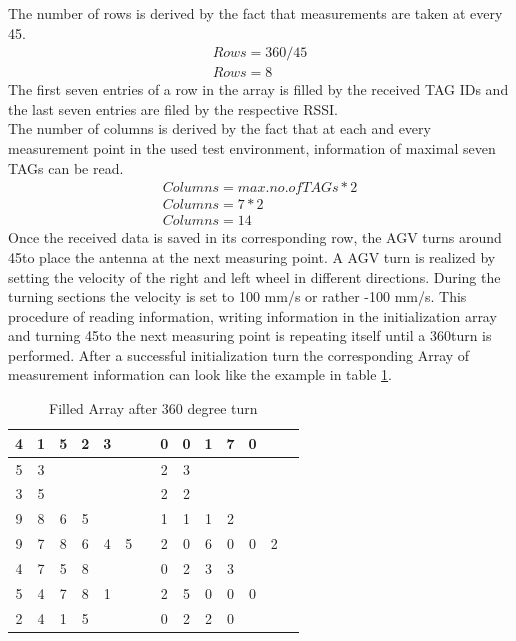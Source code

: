 The number of rows is derived by the fact that measurements are taken at every 45\textdegree. \\
\begin{align}
Rows = 360/45\\
Rows = 8
\end{align}
The first seven entries of a row in the array is filled by the received TAG IDs and the last seven entries are filed by the respective RSSI. \\
The number of columns is derived by the fact that at each and every measurement point in the used test environment, information of maximal seven TAGs can be read. \\
\begin{align}
Columns = max. no. of  TAGs * 2\\
Columns = 7 * 2\\
Columns = 14
\end{align}
Once the received data is saved in its corresponding row, the AGV turns around 45\textdegree  to place the antenna at the next measuring point. A AGV turn is realized by setting the velocity of the right and left wheel in different directions. During the turning sections the velocity is set to 100 mm/s or rather -100 mm/s. 
This procedure of reading information, writing information in the initialization array and turning 45\textdegree  to the next measuring point is repeating itself until a 360\textdegree  turn is performed. After a successful initialization turn the corresponding Array of measurement information can look like the example in table \ref{Init_Array}.
\begin{table}[!htbp]
\centering
\begin{tabular}{|c|c|c|c|c|c|c|c|c|c|c|c|c|c|}
\hline
4&1&5&2&3&&&0&0&1&7&0&&  \\ \hline
5&3&&&&&&2&3&&&&&  \\ \hline
3&5&&&&&&2&2&&&&&  \\ \hline
9&8&6&5&&&&1&1&1&2&&&  \\ \hline
9&7&8&6&4&5&&2&0&6&0&0&2&  \\ \hline
4&7&5&8&&&&0&2&3&3&&&  \\ \hline
5&4&7&8&1&&&2&5&0&0&0&&  \\ \hline
2&4&1&5&&&&0&2&2&0&&&  \\ \hline
\end{tabular}
\caption{Filled Array after 360 degree turn}
\label{Init_Array}
\end{table}\\
